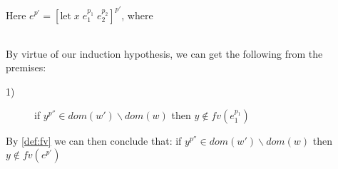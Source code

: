 \item[\runa{Ref-read}] Here $e^{p'}=[\mbox{let}\;x\;e_1^{p_1}\;e_2^{p_2}]^{p'}$, where
\begin{figure}[H]
	\setlength\tabcolsep{8pt}
	\begin{tabular}{l}
		
	\end{tabular}
\end{figure}
By virtue of our induction hypothesis, we can get the following from the premises:
\begin{description}
	\item[1)] if $y^{p''}\in dom(w')\backslash dom(w)$ then $y\notin fv(e_1^{p_1})$
\end{description}
By \cref{def:fv} we can then conclude that: if $y^{p''}\in dom(w')\backslash dom(w)$ then $y\notin fv(e^{p'})$
